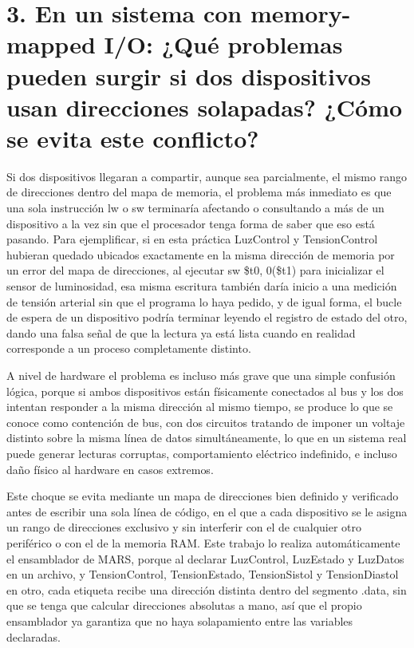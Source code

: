 \documentclass[12pt, letterpaper]{article}
\begin{document}
\section*{\textbf{3. En un sistema con memory-mapped I/O: ¿Qué problemas pueden surgir si dos dispositivos usan direcciones solapadas? ¿Cómo se evita este conflicto?}}

Si dos dispositivos llegaran a compartir, aunque sea parcialmente, el mismo rango de direcciones dentro del mapa de memoria, el problema más inmediato es que una sola instrucción lw o sw terminaría afectando o consultando a más de un dispositivo a la vez sin que el procesador tenga forma de saber que eso está pasando. Para ejemplificar, si en esta práctica LuzControl y TensionControl hubieran quedado ubicados exactamente en la misma dirección de memoria por un error del mapa de direcciones, al ejecutar sw \$t0, 0(\$t1) para inicializar el sensor de luminosidad, esa misma escritura también daría inicio a una medición de tensión arterial sin que el programa lo haya pedido, y de igual forma, el bucle de espera de un dispositivo podría terminar leyendo el registro de estado del otro, dando una falsa señal de que la lectura ya está lista cuando en realidad corresponde a un proceso completamente distinto.

A nivel de hardware el problema es incluso más grave que una simple confusión lógica, porque si ambos dispositivos están físicamente conectados al bus y los dos intentan responder a la misma dirección al mismo tiempo, se produce lo que se conoce como contención de bus, con dos circuitos tratando de imponer un voltaje distinto sobre la misma línea de datos simultáneamente, lo que en un sistema real puede generar lecturas corruptas, comportamiento eléctrico indefinido, e incluso daño físico al hardware en casos extremos.

Este choque se evita mediante un mapa de direcciones bien definido y verificado antes de escribir una sola línea de código, en el que a cada dispositivo se le asigna un rango de direcciones exclusivo y sin interferir con el de cualquier otro periférico o con el de la memoria RAM. Este trabajo lo realiza automáticamente el ensamblador de MARS, porque al declarar LuzControl, LuzEstado y LuzDatos en un archivo, y TensionControl, TensionEstado, TensionSistol y TensionDiastol en otro, cada etiqueta recibe una dirección distinta dentro del segmento .data, sin que se tenga que calcular direcciones absolutas a mano, así que el propio ensamblador ya garantiza que no haya solapamiento entre las variables declaradas.
\end{document}
